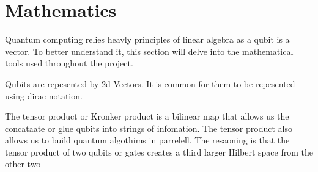 
\section{Mathematics} Quantum computing relies heavly principles of linear algebra as a qubit 
is a vector. To better understand it, this section will delve into the mathematical tools used
throughout the project.

\begin{subsection}
    Qubits are repesented by 2d Vectors. It is common for them to 
    be repesented using  dirac notation.    
\end{subsection}
\begin{subsection}
    The tensor product or Kronker product is a bilinear map that allows
    us the concataate or glue qubits into strings of infomation. The tensor product 
    also allows us to build quantum algothims in parrelell.
    The resaoning is that the tensor product of two qubits or gates creates a 
    third larger Hilbert space from the other two
\end{subsection}